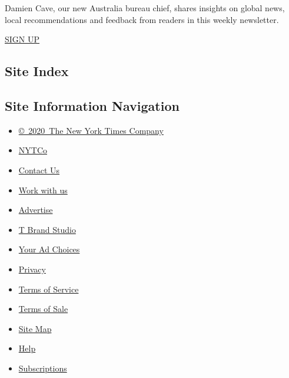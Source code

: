 Damien Cave, our new Australia bureau chief, shares insights on global
news, local recommendations and feedback from readers in this weekly
newsletter.

\href{/newsletters/signup/AUST}{SIGN UP}

\hypertarget{site-index}{%
\subsection{Site Index}\label{site-index}}

\hypertarget{site-information-navigation}{%
\subsection{Site Information
Navigation}\label{site-information-navigation}}

\begin{itemize}
\tightlist
\item
  \href{https://help.nytimes.com/hc/en-us/articles/115014792127-Copyright-notice}{©~2020~The
  New York Times Company}
\end{itemize}

\begin{itemize}
\tightlist
\item
  \href{https://www.nytco.com/}{NYTCo}
\item
  \href{https://help.nytimes.com/hc/en-us/articles/115015385887-Contact-Us}{Contact
  Us}
\item
  \href{https://www.nytco.com/careers/}{Work with us}
\item
  \href{https://nytmediakit.com/}{Advertise}
\item
  \href{http://www.tbrandstudio.com/}{T Brand Studio}
\item
  \href{https://www.nytimes.com/privacy/cookie-policy\#how-do-i-manage-trackers}{Your
  Ad Choices}
\item
  \href{https://www.nytimes.com/privacy}{Privacy}
\item
  \href{https://help.nytimes.com/hc/en-us/articles/115014893428-Terms-of-service}{Terms
  of Service}
\item
  \href{https://help.nytimes.com/hc/en-us/articles/115014893968-Terms-of-sale}{Terms
  of Sale}
\item
  \href{https://spiderbites.nytimes.com}{Site Map}
\item
  \href{https://help.nytimes.com/hc/en-us}{Help}
\item
  \href{https://www.nytimes.com/subscription?campaignId=37WXW}{Subscriptions}
\end{itemize}
